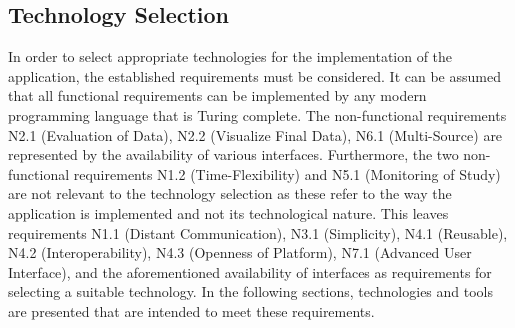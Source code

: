 \subsection{Technology Selection}

In order to select appropriate technologies for the implementation of the application, the established requirements must be considered. It can be assumed that all functional requirements can be implemented by any modern programming language that is Turing complete. The non-functional requirements N2.1 (Evaluation of Data), N2.2 (Visualize Final Data), N6.1 (Multi-Source) are represented by the availability of various interfaces. Furthermore, the two non-functional requirements N1.2 (Time-Flexibility) and N5.1 (Monitoring of Study) are not relevant to the technology selection as these refer to the way the application is implemented and not its technological nature. This leaves requirements N1.1 (Distant Communication), N3.1 (Simplicity), N4.1 (Reusable), N4.2 (Interoperability), N4.3 (Openness of Platform), N7.1 (Advanced User Interface), and the aforementioned availability of interfaces as requirements for selecting a suitable technology. In the following sections, technologies and tools are presented that are intended to meet these requirements.



